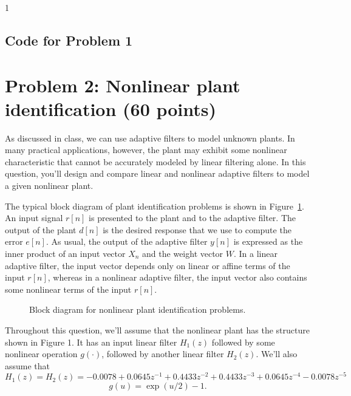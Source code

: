 \documentclass[10pt]{article}
\def\SOLUTIONS{0} %
\begin{document}
\if\SOLUTIONS1 
\subsection*{Code for Problem 1}

\fi

\newpage

\section*{Problem 2: Nonlinear plant identification (60 points)}

As discussed in class, we can use adaptive filters to model unknown plants. In many practical applications, however, the plant may exhibit some nonlinear characteristic that cannot be accurately modeled by linear filtering alone. In this question, you'll design and compare linear and nonlinear adaptive filters to model a given nonlinear plant.

The typical block diagram of plant identification problems is shown in Figure~\ref{fig:block-diagram}. An input signal $r[n]$ is presented to the plant and to the adaptive filter. The output of the plant $d[n]$ is the desired response that we use to compute the error $e[n]$. As usual, the output of the adaptive filter $y[n]$ is expressed as the inner product of an input vector $X_n$ and the weight vector $W$. In a linear adaptive filter, the input vector depends only on linear or affine terms of the input $r[n]$, whereas in a nonlinear adaptive filter, the input vector also contains some nonlinear terms of the input $r[n]$.

\begin{figure}[h!]
	\flushleft
	\resizebox{\linewidth}{!}{}
	\caption{Block diagram for nonlinear plant identification problems. } \label{fig:block-diagram}
\end{figure}

Throughout this question, we'll assume that the nonlinear plant has the structure shown in Figure 1. It has an input linear filter $H_1(z)$ followed by some nonlinear operation $g(\cdot)$, followed by another linear filter $H_2(z)$. We'll also assume that
\begin{equation}
H_1(z) = H_2(z) = -0.0078 + 0.0645z^{-1} +  0.4433z^{-2} + 0.4433z^{-3}+ 0.0645z^{-4} -0.0078z^{-5}
\end{equation}
\begin{equation}
g(u) = \exp(u/2) - 1.
\end{equation}
\end{document}
